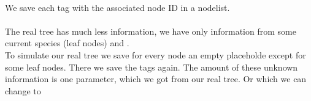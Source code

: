        \\
      We save each tag with the associated node ID in a nodelist. \\
       \\
      The real tree has much less information, we have only information from some current species 
        (leaf nodes) and . \\
      To simulate our real tree we save for every node an empty placeholde except for some leaf nodes.
      There we save the tags again. The amount of these unknown information is one parameter, which we
      got from our real tree. Or which we can change to 

